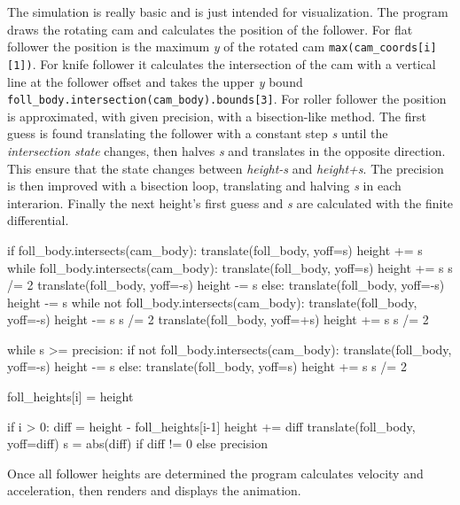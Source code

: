\documentclass[a4paper,10pt,twoside]{article}
\begin{document}
    The simulation is really basic and is just intended for visualization. The program draws the rotating cam and calculates
    the position of the follower. For flat follower the position is the maximum \emph{y} of the rotated cam
    \texttt{max(cam_coords[i][1])}.
    For knife follower it calculates the intersection of the cam with a
    vertical line at the follower offset and takes the upper \emph{y} bound
    \texttt{foll_body.intersection(cam_body).bounds[3]}.
    For roller follower the position is approximated, with given precision, with a bisection-like method.
    The first guess is found translating the follower with a constant step \emph{s} until the \emph{intersection state}
    changes, then halves \emph{s} and translates in the opposite direction.
    This ensure that the state changes between \emph{height-s} and \emph{height+s}.
    The precision is then improved with a bisection loop, translating and halving \emph{s} in each interarion.
    Finally the next height's first guess and \emph{s} are calculated with the finite differential.
    \begin{pycode}
    if foll_body.intersects(cam_body):
        translate(foll_body, yoff=s)
        height += s
        while foll_body.intersects(cam_body):
            translate(foll_body, yoff=s)
            height += s
        s /= 2
        translate(foll_body, yoff=-s)
        height -= s
    else:
        translate(foll_body, yoff=-s)
        height -= s
        while not foll_body.intersects(cam_body):
            translate(foll_body, yoff=-s)
            height -= s
        s /= 2
        translate(foll_body, yoff=+s)
        height += s
    s /= 2

    while s >= precision:
        if not foll_body.intersects(cam_body):
            translate(foll_body, yoff=-s)
            height -= s
        else:
            translate(foll_body, yoff=s)
            height += s
        s /= 2

    foll_heights[i] = height

    if i > 0:
        diff = height - foll_heights[i-1]
        height += diff
        translate(foll_body, yoff=diff)
        s = abs(diff) if diff != 0 else precision
    \end{pycode}

    Once all follower heights are determined the program calculates velocity and acceleration,
    then renders and displays the animation.

%
\end{document}
